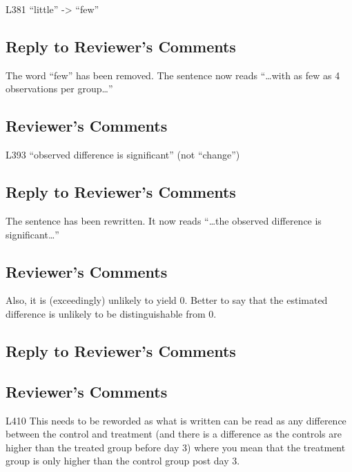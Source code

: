 \documentclass[
]{article}
\begin{document}
L381 ``little'' -\textgreater{} ``few''

\hypertarget{section-32}{%
\subsection{\texorpdfstring{\textcolor{reviewersblue} {Reply to Reviewer's Comments}}{}}\label{section-32}}

The word ``few'' has been removed. The sentence now reads ``\ldots with as few as 4 observations per group\ldots{}''

\hypertarget{reviewers-comments-32}{%
\subsection{Reviewer's Comments}\label{reviewers-comments-32}}

L393 ``observed difference is significant'' (not ``change'')

\hypertarget{section-33}{%
\subsection{\texorpdfstring{\textcolor{reviewersblue} {Reply to Reviewer's Comments}}{}}\label{section-33}}

The sentence has been rewritten. It now reads ``\ldots the observed difference is significant\ldots{}''

\hypertarget{reviewers-comments-33}{%
\subsection{Reviewer's Comments}\label{reviewers-comments-33}}

Also, it is (exceedingly) unlikely to yield 0. Better to say that the estimated difference is unlikely to be distinguishable from 0.

\hypertarget{section-34}{%
\subsection{\texorpdfstring{\textcolor{reviewersblue} {Reply to Reviewer's Comments}}{}}\label{section-34}}

\hypertarget{reviewers-comments-34}{%
\subsection{Reviewer's Comments}\label{reviewers-comments-34}}

L410 This needs to be reworded as what is written can be read as any difference between the control and treatment (and there is a difference as the controls are higher than the treated group before day 3) where you mean that the treatment group is only higher than the control group post day 3.
\end{document}
